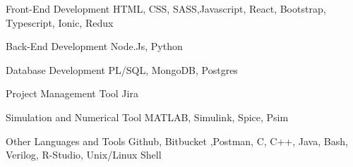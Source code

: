 \newcommand{\Csh}{C{\lserif\#}}



\begin{cvskills}




\cvskill
{Front-End Development} %
{HTML, CSS, SASS,Javascript, React, Bootstrap, Typescript, Ionic, Redux} %


\cvskill
{Back-End Development} %
{Node.Js, Python} %


\cvskill
{Database Development} %
{PL/SQL, MongoDB, Postgres} %





\cvskill
{Project Management Tool} %
{Jira} %




\cvskill
{Simulation and Numerical Tool} %
{MATLAB, Simulink, Spice, Psim} %


\cvskill
{Other Languages and Tools} %
{Github, Bitbucket ,Postman, C, C++, Java, Bash, Verilog, R-Studio, Unix/Linux Shell} %


\end{cvskills}
